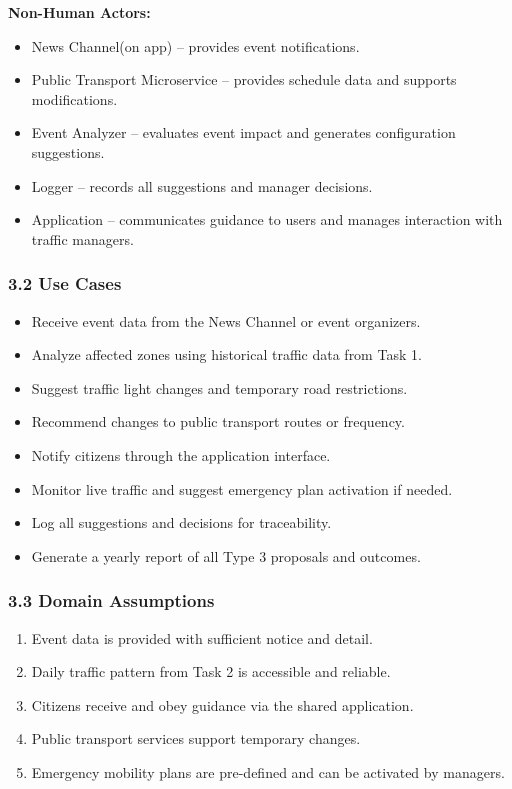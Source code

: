 \textbf{Non-Human Actors:}
\begin{itemize}
    \item News Channel(on app) – provides event notifications.
    \item Public Transport Microservice – provides schedule data and supports modifications.
    \item Event Analyzer – evaluates event impact and generates configuration suggestions.
    \item Logger – records all suggestions and manager decisions.
    \item Application – communicates guidance to users and manages interaction with traffic managers.
\end{itemize}

\subsubsection*{3.2 Use Cases}

\begin{itemize}
    \item Receive event data from the News Channel or event organizers.
    \item Analyze affected zones using historical traffic data from Task 1.
    \item Suggest traffic light changes and temporary road restrictions.
    \item Recommend changes to public transport routes or frequency.
    \item Notify citizens through the application interface.
    \item Monitor live traffic and suggest emergency plan activation if needed.
    \item Log all suggestions and decisions for traceability.
    \item Generate a yearly report of all Type 3 proposals and outcomes.
\end{itemize}

\subsubsection*{3.3 Domain Assumptions}

\begin{enumerate}
    \item Event data is provided with sufficient notice and detail.
    \item Daily traffic pattern from Task 2 is accessible and reliable.
    \item Citizens receive and obey guidance via the shared application.
    \item Public transport services support temporary changes.
    \item Emergency mobility plans are pre-defined and can be activated by managers.
\end{enumerate}

